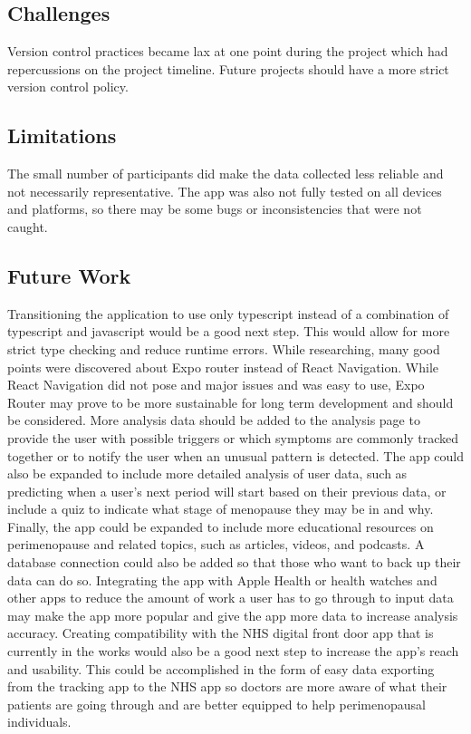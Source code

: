 \subsection{Challenges}
Version control practices became lax at one point during the project which had repercussions on the project timeline. Future projects should have a more strict version control policy. 

\subsection{Limitations}
The small number of participants did make the data collected less reliable and not necessarily representative. The app was also not fully tested on all devices and platforms, so there may be some bugs or inconsistencies that were not caught.

\subsection{Future Work}
Transitioning the application to use only typescript instead of a combination of typescript and javascript would be a good next step. This would allow for more strict type checking and reduce runtime errors. While researching, many good points were discovered about Expo router instead of React Navigation. While React Navigation did not pose and major issues and was easy to use, Expo Router may prove to be more sustainable for long term development and should be considered. More analysis data should be added to the analysis page to provide the user with possible triggers or which symptoms are commonly tracked together or to notify the user when an unusual pattern is detected. The app could also be expanded to include more detailed analysis of user data, such as predicting when a user's next period will start based on their previous data, or include a quiz to indicate what stage of menopause they may be in and why. Finally, the app could be expanded to include more educational resources on perimenopause and related topics, such as articles, videos, and podcasts. A database connection could also be added so that those who want to back up their data can do so. Integrating the app with Apple Health or health watches and other apps to reduce the amount of work a user has to go through to input data may make the app more popular and give the app more data to increase analysis accuracy. Creating compatibility with the NHS digital front door app that is currently in the works would also be a good next step to increase the app's reach and usability. This could be accomplished in the form of easy data exporting from the tracking app to the NHS app so doctors are more aware of what their patients are going through and are better equipped to help perimenopausal individuals.

